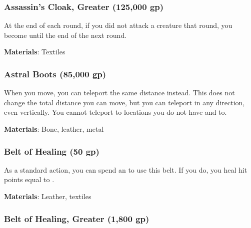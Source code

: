 \lowercase{\hypertarget{item:Assassin's Cloak, Greater}{}}\label{item:Assassin's Cloak, Greater}
\hypertarget{item:Assassin's Cloak, Greater}{\subsubsection{Assassin's Cloak, Greater\hfill{} (125,000 gp)}}

At the end of each round, if you did not attack a creature that round, you become  until the end of the next round.



\vspace{0.25em}
\textbf{Materials}: Textiles


\lowercase{\hypertarget{item:Astral Boots}{}}\label{item:Astral Boots}
\hypertarget{item:Astral Boots}{\subsubsection{Astral Boots\hfill{} (85,000 gp)}}

When you move, you can teleport the same distance instead.
This does not change the total distance you can move, but you can teleport in any direction, even vertically.
You cannot teleport to locations you do not have  and  to.



\vspace{0.25em}
\textbf{Materials}: Bone, leather, metal


\lowercase{\hypertarget{item:Belt of Healing}{}}\label{item:Belt of Healing}
\hypertarget{item:Belt of Healing}{\subsubsection{Belt of Healing\hfill{} (50 gp)}}

As a standard action, you can spend an  to use this belt.
If you do, you heal hit points equal to .



\vspace{0.25em}
\textbf{Materials}: Leather, textiles


\lowercase{\hypertarget{item:Belt of Healing, Greater}{}}\label{item:Belt of Healing, Greater}
\hypertarget{item:Belt of Healing, Greater}{\subsubsection{Belt of Healing, Greater\hfill{} (1,800 gp)}}


